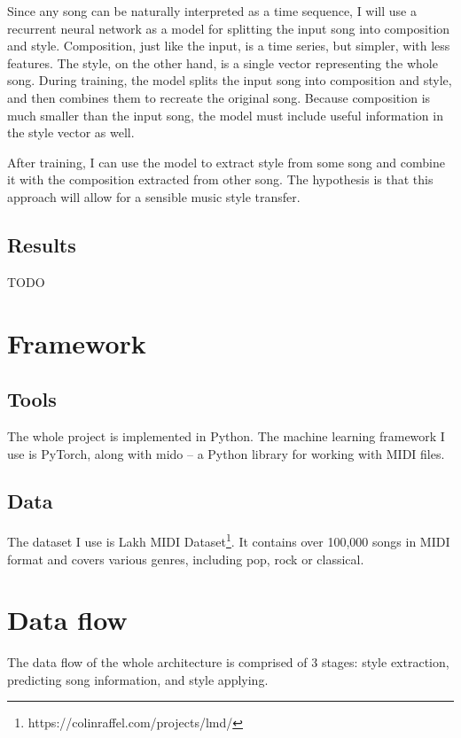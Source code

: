 \documentclass[en]{pracamgr}
\begin{document}
Since any song can be naturally interpreted as a time sequence, I will use a recurrent neural network as a model for splitting the input song into composition and style.
Composition, just like the input, is a time series, but simpler, with less features.
The style, on the other hand, is a single vector representing the whole song.
During training, the model splits the input song into composition and style, and then combines them to recreate the original song.
Because composition is much smaller than the input song, the model must include useful information in the style vector as well.

After training, I can use the model to extract style from some song and combine it with the composition extracted from other song.
The hypothesis is that this approach will allow for a sensible music style transfer.

\section{Results}

TODO

\chapter{Framework}

\section{Tools}

The whole project is implemented in Python.
The machine learning framework I use is PyTorch, along with mido -- a Python library for working with MIDI files.

\section{Data}

The dataset I use is Lakh MIDI Dataset\footnote{https://colinraffel.com/projects/lmd/}.
It contains over 100,000 songs in MIDI format and covers various genres, including pop, rock or classical.

\chapter{Data flow}

The data flow of the whole architecture is comprised of 3 stages: style extraction, predicting song information, and style applying.
\end{document}
